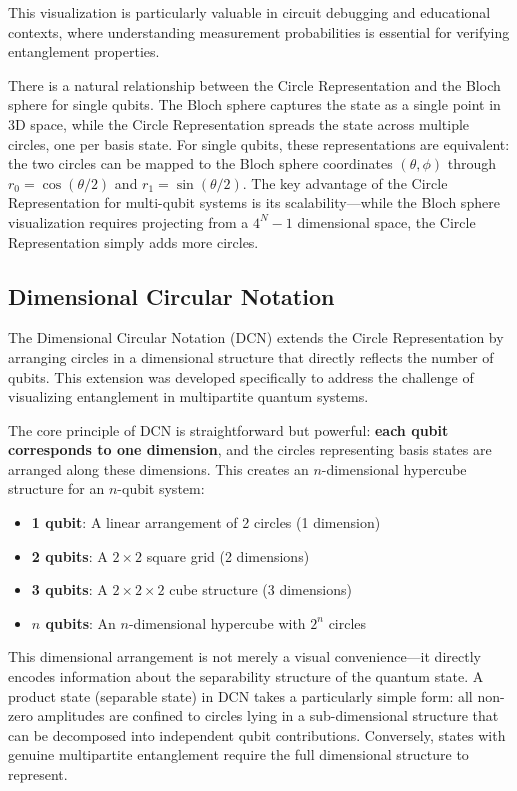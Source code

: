 \documentclass[%
 amsmath,amssymb,
 aps,
rmp,
]{revtex4-2}
\begin{document}
This visualization is particularly valuable in circuit debugging and educational contexts, where understanding measurement probabilities is essential for verifying entanglement properties.

There is a natural relationship between the Circle Representation and the Bloch sphere for single qubits. The Bloch sphere captures the state as a single point in 3D space, while the Circle Representation spreads the state across multiple circles, one per basis state. For single qubits, these representations are equivalent: the two circles can be mapped to the Bloch sphere coordinates $(\theta, \phi)$ through $r_0 = \cos(\theta/2)$ and $r_1 = \sin(\theta/2)$. The key advantage of the Circle Representation for multi-qubit systems is its scalability---while the Bloch sphere visualization requires projecting from a $4^N - 1$ dimensional space, the Circle Representation simply adds more circles.

\subsection{Dimensional Circular Notation}
\label{sec:dcn}

The Dimensional Circular Notation (DCN) extends the Circle Representation by arranging circles in a dimensional structure that directly reflects the number of qubits. This extension was developed specifically to address the challenge of visualizing entanglement in multipartite quantum systems.

The core principle of DCN is straightforward but powerful: \textbf{each qubit corresponds to one dimension}, and the circles representing basis states are arranged along these dimensions. This creates an $n$-dimensional hypercube structure for an $n$-qubit system:

\begin{itemize}
	\item \textbf{1 qubit}: A linear arrangement of 2 circles (1 dimension)
	\item \textbf{2 qubits}: A $2 \times 2$ square grid (2 dimensions)
	\item \textbf{3 qubits}: A $2 \times 2 \times 2$ cube structure (3 dimensions)
	\item \textbf{$n$ qubits}: An $n$-dimensional hypercube with $2^n$ circles
\end{itemize}

This dimensional arrangement is not merely a visual convenience---it directly encodes information about the separability structure of the quantum state. A product state (separable state) in DCN takes a particularly simple form: all non-zero amplitudes are confined to circles lying in a sub-dimensional structure that can be decomposed into independent qubit contributions. Conversely, states with genuine multipartite entanglement require the full dimensional structure to represent.
\end{document}

